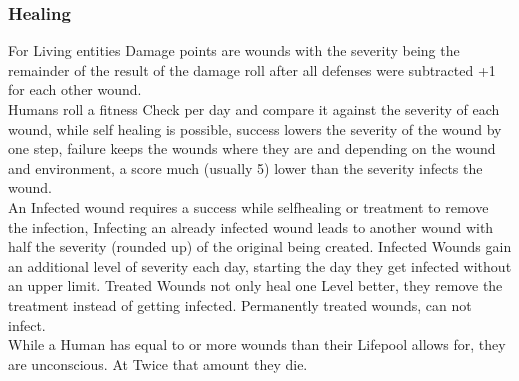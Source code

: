     \subsubsection{Healing}
    For Living entities Damage points are wounds with the severity being the remainder of the result of the damage roll
    after all defenses were subtracted +1 for each other wound.\\
    Humans roll a fitness Check per day and compare it against the severity of each wound, while self healing is
    possible, success lowers the severity of the wound by one step, failure keeps the wounds where they are and
    depending on the wound and environment, a score much (usually 5) lower than the severity infects the wound.\\
    An Infected wound requires a success while selfhealing or treatment to remove the infection, Infecting an already
    infected wound leads to another wound with half the severity (rounded up) of the original being created.
    Infected
    Wounds gain an additional level of  severity each day, starting the day they get infected without an upper limit.
    Treated Wounds not only heal one Level better, they remove the treatment instead of getting infected.
    Permanently
    treated wounds, can not infect. \\
    While a Human has equal to or more wounds than their Lifepool allows for, they are unconscious.
    At Twice that amount
    they die.
